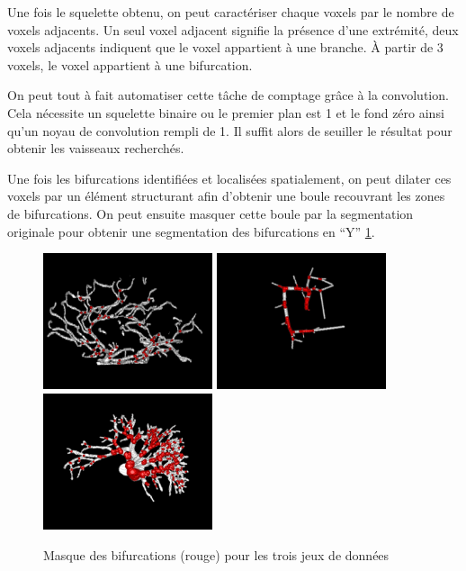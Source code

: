 Une fois le squelette obtenu, on peut caractériser chaque voxels par le nombre de voxels adjacents. Un seul voxel adjacent signifie la présence d'une extrémité, deux voxels adjacents indiquent que le voxel appartient à une branche. À partir de 3 voxels, le voxel appartient à une bifurcation.

On peut tout à fait automatiser cette tâche de comptage grâce à la convolution. Cela nécessite un squelette binaire ou le premier plan est 1 et le  fond zéro ainsi qu'un noyau de convolution rempli de 1. Il suffit alors de seuiller le résultat pour obtenir les vaisseaux recherchés.

Une fois les bifurcations identifiées et localisées spatialement, on peut dilater ces voxels par un élément structurant afin d'obtenir une boule recouvrant les zones de bifurcations. On peut ensuite masquer cette boule par la segmentation originale pour obtenir une segmentation des bifurcations en ``Y'' \ref{fig:bifurcations_masks}.

\begin{figure}[h]
  \centering
  \includegraphics[height=4cm]{Images/bifurcations_bullitt.png}
  \includegraphics[height=4cm]{Images/bifurcations_vascu.png}
  \includegraphics[height=4cm]{Images/bifurcations_ircad.png}
  \caption{Masque des bifurcations (rouge) pour les trois jeux de données}
  \label{fig:bifurcations_masks}
\end{figure}

